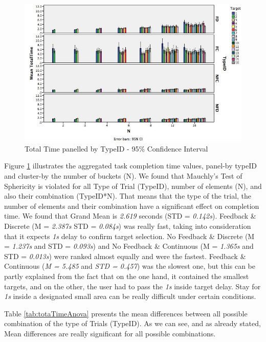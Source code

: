 \begin{figure}[H]
\centering
\includegraphics[width=\textwidth]{figures/meanTotalTime}
\caption{Total Time panelled by TypeID  - 95\% Confidence Interval}
\label{fig:meanTotalTime}
\end{figure}

Figure \ref{fig:meanTotalTime} illustrates the aggregated task completion time values, panel-by typeID and cluster-by the number of buckets (N).
 We found that Mauchly's Test of Sphericity is violated for all Type of Trial (TypeID), number of elements (N), and also their combination (TypeID*N). That means that the type of the trial, the number of elements and their combination have a significant effect on completion time. We found that Grand Mean is \emph{2.619} seconds (STD = \emph{0.142s}). Feedback \& Discrete (M = \emph{2.387s} STD = \emph{0.084s}) was really fast, taking into consideration that it expects \emph{1s} delay to confirm target selection.
  No Feedback \& Discrete (M = \emph{1.237s} and STD = \emph{0.093s}) and No Feedback \& Continuous (M = \emph{1.365s} and STD = \emph{0.013s}) were ranked almost equally and were the fastest. Feedback \& Continuous (\emph{M = 5.485} and \emph{STD = 0.457}) was the slowest one, but this can be partly explained from the fact that on the one hand, it contained the smallest targets, and on the other, the user had to pass the \emph{1s} inside target delay. Stay for \emph{1s} inside a designated small area can be really difficult under certain conditions.

Table \ref{tab:totaTimeAnova} presents the mean differences between all possible combination of the type of Trials (TypeID). As we can see, and  as already stated, Mean differences are really significant for all possible combinations.


